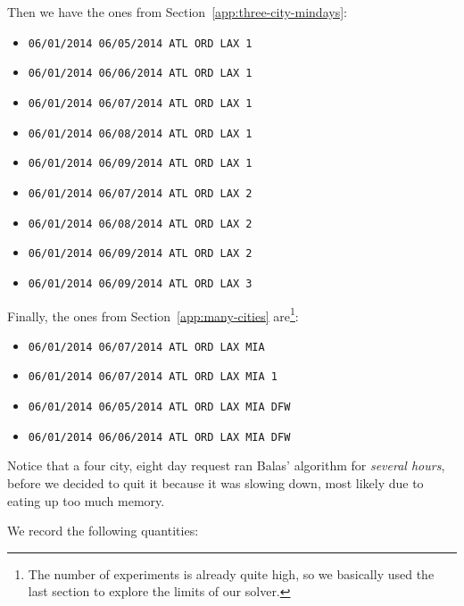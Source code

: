 \documentclass{article}
\begin{document}
Then we have the ones from Section~\ref{app:three-city-mindays}:

\begin{itemize}[noitemsep]
    \item \texttt{06/01/2014 06/05/2014 ATL ORD LAX 1}
    \item \texttt{06/01/2014 06/06/2014 ATL ORD LAX 1}
    \item \texttt{06/01/2014 06/07/2014 ATL ORD LAX 1}
    \item \texttt{06/01/2014 06/08/2014 ATL ORD LAX 1}
    \item \texttt{06/01/2014 06/09/2014 ATL ORD LAX 1}
    \item \texttt{06/01/2014 06/07/2014 ATL ORD LAX 2}
    \item \texttt{06/01/2014 06/08/2014 ATL ORD LAX 2}
    \item \texttt{06/01/2014 06/09/2014 ATL ORD LAX 2}
    \item \texttt{06/01/2014 06/09/2014 ATL ORD LAX 3}
\end{itemize}

Finally, the ones from Section~\ref{app:many-cities} are\footnote{The number of experiments is already quite high, so we basically used the last
section to explore the limits of our solver.}:

\begin{itemize}[noitemsep]
    \item \texttt{06/01/2014 06/07/2014 ATL ORD LAX MIA}
    \item \texttt{06/01/2014 06/07/2014 ATL ORD LAX MIA 1}
    \item \texttt{06/01/2014 06/05/2014 ATL ORD LAX MIA DFW}
    \item \texttt{06/01/2014 06/06/2014 ATL ORD LAX MIA DFW}
\end{itemize}

Notice that a four city, eight day request ran Balas' algorithm for \emph{several hours}, before we decided to quit it because it was slowing down,
most likely due to eating up too much memory.

We record the following quantities:
\end{document}
